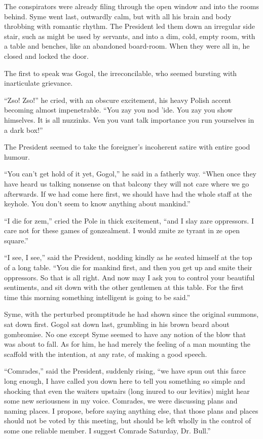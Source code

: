 \documentclass{book}
\begin{document}
The conspirators were already filing through the open window and into the rooms behind. Syme went last, outwardly calm, but with all his brain and body throbbing with romantic rhythm. The President led them down an irregular side stair, such as might be used by servants, and into a dim, cold, empty room, with a table and benches, like an abandoned board-room. When they were all in, he closed and locked the door.

The first to speak was Gogol, the irreconcilable, who seemed bursting with inarticulate grievance.

“Zso! Zso!” he cried, with an obscure excitement, his heavy Polish accent becoming almost impenetrable. “You zay you nod ’ide. You zay you show himselves. It is all nuzzinks. Ven you vant talk importance you run yourselves in a dark box!”

The President seemed to take the foreigner’s incoherent satire with entire good humour.

“You can’t get hold of it yet, Gogol,” he said in a fatherly way. “When once they have heard us talking nonsense on that balcony they will not care where we go afterwards. If we had come here first, we should have had the whole staff at the keyhole. You don’t seem to know anything about mankind.”

“I die for zem,” cried the Pole in thick excitement, “and I slay zare oppressors. I care not for these games of gonzealment. I would zmite ze tyrant in ze open square.”

“I see, I see,” said the President, nodding kindly as he seated himself at the top of a long table. “You die for mankind first, and then you get up and smite their oppressors. So that is all right. And now may I ask you to control your beautiful sentiments, and sit down with the other gentlemen at this table. For the first time this morning something intelligent is going to be said.”

Syme, with the perturbed promptitude he had shown since the original summons, sat down first. Gogol sat down last, grumbling in his brown beard about gombromise. No one except Syme seemed to have any notion of the blow that was about to fall. As for him, he had merely the feeling of a man mounting the scaffold with the intention, at any rate, of making a good speech.

“Comrades,” said the President, suddenly rising, “we have spun out this farce long enough, I have called you down here to tell you something so simple and shocking that even the waiters upstairs (long inured to our levities) might hear some new seriousness in my voice. Comrades, we were discussing plans and naming places. I propose, before saying anything else, that those plans and places should not be voted by this meeting, but should be left wholly in the control of some one reliable member. I suggest Comrade Saturday, Dr. Bull.”
\end{document}
